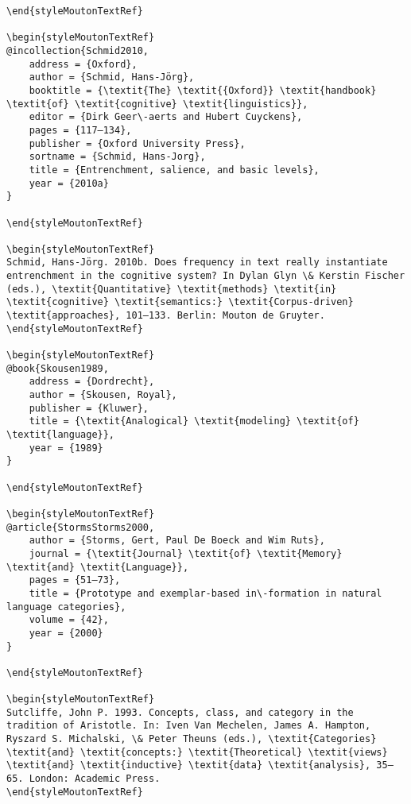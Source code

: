 \begin{styleMoutonHeadingi}
\begin{verbatim}
\end{styleMoutonTextRef}

\begin{styleMoutonTextRef}
@incollection{Schmid2010,
	address = {Oxford},
	author = {Schmid, Hans-Jörg},
	booktitle = {\textit{The} \textit{{Oxford}} \textit{handbook} \textit{of} \textit{cognitive} \textit{linguistics}},
	editor = {Dirk Geer\-aerts and Hubert Cuyckens},
	pages = {117–134},
	publisher = {Oxford University Press},
	sortname = {Schmid, Hans-Jorg},
	title = {Entrenchment, salience, and basic levels},
	year = {2010a}
}

\end{styleMoutonTextRef}

\begin{styleMoutonTextRef}
Schmid, Hans-Jörg. 2010b. Does frequency in text really instantiate entrenchment in the cognitive system? In Dylan Glyn \& Kerstin Fischer (eds.), \textit{Quantitative} \textit{methods} \textit{in} \textit{cognitive} \textit{semantics:} \textit{Corpus-driven} \textit{approaches}, 101–133. Berlin: Mouton de Gruyter.
\end{styleMoutonTextRef}

\begin{styleMoutonTextRef}
@book{Skousen1989,
	address = {Dordrecht},
	author = {Skousen, Royal},
	publisher = {Kluwer},
	title = {\textit{Analogical} \textit{modeling} \textit{of} \textit{language}},
	year = {1989}
}

\end{styleMoutonTextRef}

\begin{styleMoutonTextRef}
@article{StormsStorms2000,
	author = {Storms, Gert, Paul De Boeck and Wim Ruts},
	journal = {\textit{Journal} \textit{of} \textit{Memory} \textit{and} \textit{Language}},
	pages = {51–73},
	title = {Prototype and exemplar-based in\-formation in natural language categories},
	volume = {42},
	year = {2000}
}

\end{styleMoutonTextRef}

\begin{styleMoutonTextRef}
Sutcliffe, John P. 1993. Concepts, class, and category in the tradition of Aristotle. In: Iven Van Mechelen, James A. Hampton, Ryszard S. Michalski, \& Peter Theuns (eds.), \textit{Categories} \textit{and} \textit{concepts:} \textit{Theoretical} \textit{views} \textit{and} \textit{inductive} \textit{data} \textit{analysis}, 35–65. London: Academic Press.
\end{styleMoutonTextRef}


\end{verbatim}
\end{styleMoutonHeadingi}
